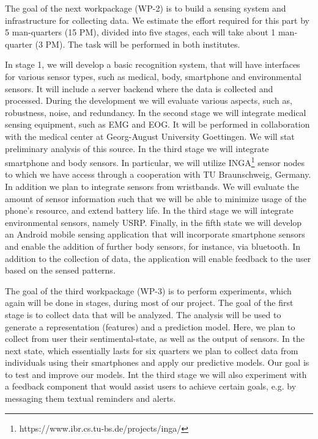 \documentclass[12pt]{article}
\begin{document}
The goal of the next workpackage (WP-2) is to build a sensing system and infrastructure for collecting data. We estimate the effort required for this part by 5 man-quarters (15 PM), divided into five stages, each will take about 1 man-quarter (3 PM). The task will be performed in both institutes. 

In stage 1, we will develop a basic recognition system, that will have interfaces for various sensor types, such as medical, body, smartphone and environmental sensors. It will include a server backend where the data is collected and processed. During the development we will evaluate various aspects, such as, robustness, noise, and redundancy.
In the second stage we will integrate medical sensing equipment, such as EMG and EOG. It will be performed in collaboration with the medical center at Georg-August University Goettingen. We will stat preliminary analysis of this source. In the third stage we will integrate smartphone and body sensors. 
In particular, we will utilize INGA\footnote{https://www.ibr.cs.tu-bs.de/projects/inga/} sensor nodes to which we have access through a cooperation with TU Braunschweig, Germany. 
In addition we plan to integrate sensors from wristbands. We will evaluate the amount of sensor information such that we will be able to minimize usage of the phone's resource, and extend battery life. In the third stage we will integrate environmental sensors, namely USRP. Finally, in the fifth state we will develop an Android mobile sensing application that will incorporate smartphone sensors and enable the addition of further body sensors, for instance, via bluetooth.
In addition to the collection of data, the application will enable feedback to the user based on the sensed patterns. 
 

The goal of the third workpackage (WP-3) is to perform experiments, which again will be done in stages, during most of our project. The goal of the first stage is to collect data that will be analyzed. The analysis will be used to generate a representation (features) and a prediction model. Here, we plan to collect from user their sentimental-state, as well as the output of sensors. In the next state, which essentially lasts for six quarters we plan to collect data from individuals using their smartphones and apply our predictive models. Our goal is to test and improve our models. Int the third stage we will also experiment with a feedback component that would assist users to achieve certain goals, e.g. by messaging them textual reminders and alerts.
 
\end{document}
